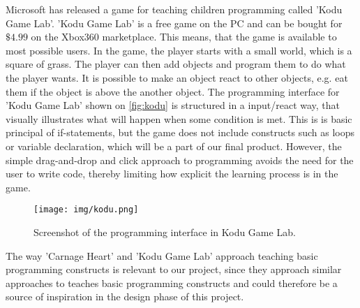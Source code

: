 Microsoft has released a game for teaching children programming called 'Kodu Game Lab'.\cite{kodu}
'Kodu Game Lab' is a free game on the PC and can be bought for $\$4.99$ on the Xbox360 marketplace.
This means, that the game is available to most possible users.
In the game, the player starts with a small world, which is a square of grass.
The player can then add objects and program them to do what the player wants.
It is possible to make an object react to other objects, e.g. eat them if the object is above the another object.
The programming interface for 'Kodu Game Lab' shown on \autoref{fig:kodu} is structured in a input/react way, that visually illustrates what will happen when some condition is met. This is is basic principal of if-statements, but the game does not include constructs such as loops or variable declaration, which will be a part of our final product. However, the simple drag-and-drop and click approach to programming avoids the need for the user to write code, thereby limiting how explicit the learning process is in the game.

\begin{figure}[h]
  \centering
    \texttt{[image: img/kodu.png]}
  \caption{Screenshot of the programming interface in Kodu Game Lab.}
  \label{fig:kodu}
\end{figure}

The way 'Carnage Heart' and 'Kodu Game Lab' approach teaching basic programming constructs is relevant to our project, since they approach similar approaches to teaches basic programming constructs and could therefore be a source of inspiration in the design phase of this project.